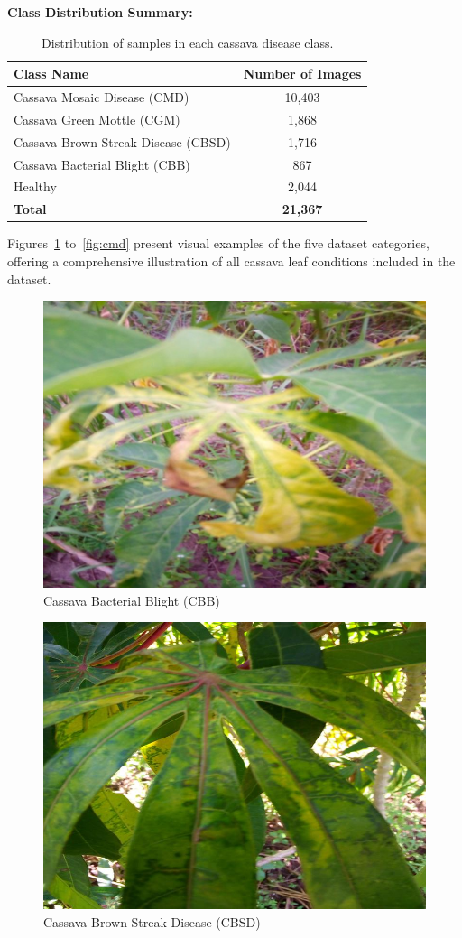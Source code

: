 \vspace{0.4cm}
\noindent\textbf{Class Distribution Summary:}

\begin{table}[H]
\centering
\begin{tabular}{|l|c|}
\hline
\textbf{Class Name} & \textbf{Number of Images} \\
\hline
Cassava Mosaic Disease (CMD) & 10,403 \\
Cassava Green Mottle (CGM)   & 1,868 \\
Cassava Brown Streak Disease (CBSD) & 1,716 \\
Cassava Bacterial Blight (CBB) & 867 \\
Healthy & 2,044 \\
\hline
\textbf{Total} & \textbf{21,367} \\
\hline
\end{tabular}
\caption{Distribution of samples in each cassava disease class.}
\label{tab:class_distribution}
\end{table}

Figures~\ref{fig:cbb} to~\ref{fig:cmd} present visual examples of the five dataset categories, offering a comprehensive illustration of all cassava leaf conditions included in the dataset.

\begin{figure}[H]
    \centering
    \includegraphics[width=0.7\linewidth]{figures/cbb.jpg}
    \caption{Cassava Bacterial Blight (CBB)}
    \label{fig:cbb}
\end{figure}

\begin{figure}[H]
    \centering
    \includegraphics[width=0.7\linewidth]{figures/cbsd.jpg}
    \caption{Cassava Brown Streak Disease (CBSD)}
    \label{fig:cbsd}
\end{figure}


